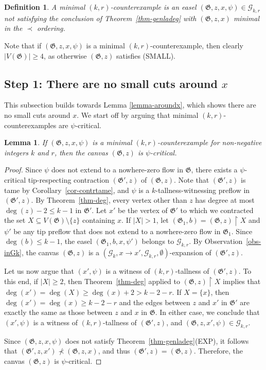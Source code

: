 \documentclass{article}
\newcommand{\GG}{\mathcal{G}}
\newcommand\g{\mathfrak{G}}
\newtheorem{lemma}[theorem]{Lemma}
\newtheorem{definition}[theorem]{Definition}
\begin{document}
\begin{definition}
A \emph{minimal $(k,r)$-counterexample} is an easel $(\g,z,x,\psi)\in\GG_{k,r}$ not satisfying the conclusion of Theorem~\ref{thm-genladeg} with $(\g,z,x)$ minimal in the $\prec$ ordering. 
\end{definition}

Note that if $(\g,z,x,\psi)$ is a minimal $(k,r)$-counterexample, then clearly $|V(\g)|\ge 4$, as otherwise $(\g,z)$ satisfies (SMALL).

\subsection{Step 1: There are no small cuts around $x$}\label{subsec:easelcuts}
This subsection builds towards Lemma \ref{lemma-aroundx}, which shows there are no small cuts around $x$. We start off by arguing that minimal $(k,r)$-counterexamples are $\psi$-critical.
\begin{lemma}\label{lemma-genladeg-psi}
If $(\g,z,x,\psi)$ is a minimal $(k,r)$-counterexample for non-negative integers $k$ and $r$, then the canvas $(\g,z)$ is $\psi$-critical.
\end{lemma}
\begin{proof}
Since $\psi$ does not extend to a nowhere-zero flow in $\g$, there exists a $\psi$-critical tip-respecting contraction $(\g',z)$ of $(\g,z)$.
Note that $(\g',z)$ is tame by Corollary~\ref{cor-contrtame}, and $\psi$ is a $k$-tallness-witnessing preflow in $(\g',z)$.
By Theorem~\ref{thm-deg}, every vertex other than $z$ has degree at most $\deg(z)-2\le k-1$ in $\g'$.  
Let $x'$ be the vertex of $\g'$ to which we contracted the set $X\subseteq V(\g)\setminus\{z\}$ containing $x$.
 If $|X|>1$, let $(\g_1,b)=(\g,z)\restriction X$ and $\psi'$ be any tip preflow that does not extend to a nowhere-zero flow in $\g_1$.
Since $\deg(b)\le k-1$, the easel $(\g_1,b,x,\psi')$ belongs to $\GG_{k,r}$.
By Observation~\ref{obs-inGk}, the canvas $(\g,z)$ is a $(\GG_k,x\to x',\GG_{k,r},\emptyset)$-expansion of $(\g',z)$.  

Let us now argue that $(x',\psi)$ is a witness of $(k,r)$-tallness of $(\g',z)$.  To this end, if $|X|\ge 2$, then Theorem~\ref{thm-deg} applied to $(\g,z)\restriction X$ implies that $\deg(x')=\deg(X)\ge \deg(x)+2>k-2-r$.
If $X=\{x\}$, then $\deg(x')=\deg(x)\ge k-2-r$ and the edges between $z$ and $x'$ in $\g'$ are exactly the same as those between $z$ and $x$ in $\g$.
In either case, we conclude that $(x',\psi)$ is a witness of $(k,r)$-tallness of $(\g',z)$, and $(\g,z,x',\psi)\in \GG_{k,r}$.

Since $(\g,z,x,\psi)$ does not satisfy Theorem~\ref{thm-genladeg}(EXP), it follows that $(\g',z,x')\not\prec (\g,z,x)$, and thus $(\g',z)=(\g,z)$.
Therefore, the canvas $(\g,z)$ is $\psi$-critical.
\end{proof}
\end{document}
